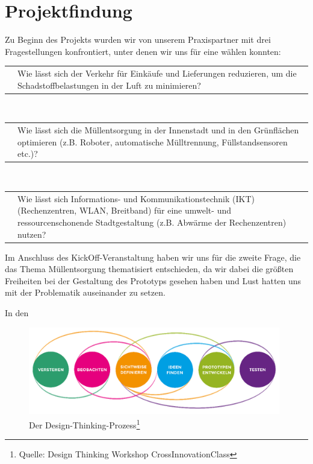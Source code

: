 \chapter{Projektfindung}

    Zu Beginn des Projekts wurden wir von unserem Praxispartner mit drei Fragestellungen konfrontiert, unter denen wir uns für eine wählen konnten:

    \vspace{1em}
    \begin{tabular}{ l|p{13.5cm} }
        \quad & Wie lässt sich der Verkehr für Einkäufe und Lieferungen reduzieren, um die Schadstoffbelastungen in der Luft zu minimieren?
    \end{tabular}
    \\[1em]
    \begin{tabular}{ l|p{13.5cm} }
        \quad & Wie lässt sich die Müllentsorgung in der Innenstadt und in den Grünflächen optimieren (z.B. Roboter, automatische Mülltrennung, Füllstandsensoren etc.)?
    \end{tabular}
    \\[1em]
    \begin{tabular}{ l|p{13.5cm} }
        \quad & Wie lässt sich Informations- und Kommunikationstechnik (IKT) (Rechenzentren, WLAN, Breitband) für eine umwelt- und ressourcenschonende Stadtgestaltung (z.B. Abwärme der Rechenzentren) nutzen? 
    \end{tabular}
    \vspace{1em}

    Im Anschluss des KickOff-Veranstaltung haben wir uns für die zweite Frage, die das Thema Müllentsorgung thematisiert entschieden, da wir dabei die größten Freiheiten bei der Gestaltung des Prototyps gesehen haben und Lust hatten uns mit der Problematik auseinander zu setzen.

    In den 

    \begin{figure}[h]
        \begin{center}
            \includegraphics[width=11cm]{media/00_introduction/design_thinking_2.png}
        \end{center}
        \caption{Der Design-Thinking-Prozess\protect\footnote{Quelle: Design Thinking Workshop CrossInnovationClass}}
        \label{fig:dt_2}
    \end{figure}

